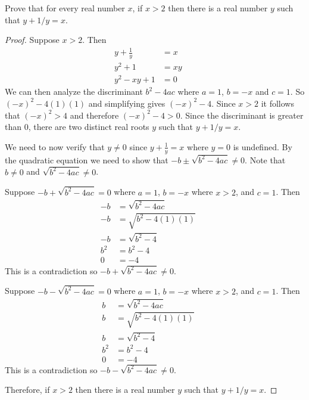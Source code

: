 \begin{tcolorbox}[title=Problem 7, breakable]
    Prove that for every real number $x$, if $x > 2$ then
    there is a real number $y$ such that $y + 1/y = x$.
\end{tcolorbox}

\begin{proof}
    Suppose $x > 2$. Then 
    \begin{align*}
        y + \frac{1}{y} & = x  &  & \\
        y^2 + 1         & = xy &  & \\
        y^2 - xy + 1    & = 0
    \end{align*}
    We can then analyze the discriminant $b^2 - 4ac$
    where $a = 1$, $b = -x$ and $c = 1$. So ${(-x)}^2 - 4(1)(1)$
    and simplifying gives ${(-x)}^2 - 4$. Since $x > 2$ it follows
    that ${(-x)}^2 > 4$ and therefore ${(-x)}^2 - 4 > 0$. Since the 
    discriminant is greater than $0$, there are two distinct real roots
    $y$ such that  $y + 1/y = x$.

    We need to now verify that $y \not = 0$ since $y + \frac{1}{y} = x$ where $y =
        0$ is undefined. By the quadratic equation we need to show that $-b \pm
        \sqrt{b^2 - 4ac} \not = 0$. Note that $b \not = 0$ and $\sqrt{b^2 - 4ac} \not =
        0$.

    Suppose $-b + \sqrt{b^2 - 4ac} = 0$ where $a = 1$, $b = -x$ where $x > 2$, and
    $c = 1$. Then 
    \begin{align*}
        -b  & = \sqrt{b^2 - 4ac}     &  & \\
        -b  & = \sqrt{b^2 - 4(1)(1)} &  & \\
        -b  & = \sqrt{b^2 - 4}       &  & \\
        b^2 & = b^2 - 4              &  & \\
        0   & = -4
    \end{align*}
    This is a contradiction so $-b + \sqrt{b^2 - 4ac} \not = 0$.

    Suppose $-b - \sqrt{b^2 - 4ac} = 0$ where $a = 1$, $b = -x$ where $x > 2$, and
    $c = 1$. Then 
    \begin{align*}
        b   & = \sqrt{b^2 - 4ac}     &  & \\
        b   & = \sqrt{b^2 - 4(1)(1)} &  & \\
        b   & = \sqrt{b^2 - 4}       &  & \\
        b^2 & = b^2 - 4              &  & \\
        0   & = -4
    \end{align*}
    This is a contradiction so $-b - \sqrt{b^2 - 4ac} \not = 0$.

    Therefore, if $x > 2$ then there is a real number $y$ such that $y + 1/y = x$.
\end{proof}

